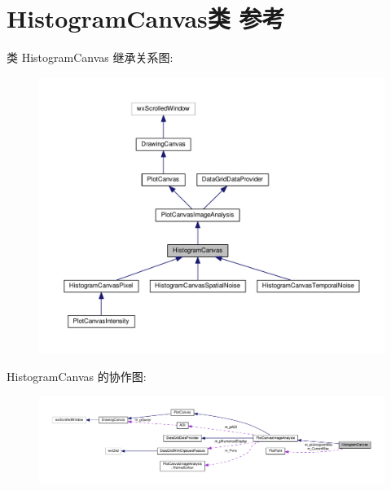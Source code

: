 \hypertarget{class_histogram_canvas}{\section{Histogram\+Canvas类 参考}
\label{class_histogram_canvas}
}


类 Histogram\+Canvas 继承关系图\+:
\nopagebreak
\begin{figure}[H]
\begin{center}
\leavevmode
\includegraphics[width=350pt]{class_histogram_canvas__inherit__graph}
\end{center}
\end{figure}


Histogram\+Canvas 的协作图\+:
\nopagebreak
\begin{figure}[H]
\begin{center}
\leavevmode
\includegraphics[width=350pt]{class_histogram_canvas__coll__graph}
\end{center}
\end{figure}
